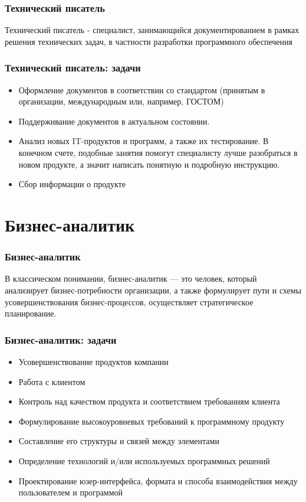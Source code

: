 \documentclass{../industrial-development}
\begin{document}
	\begin{frame} \frametitle{Технический писатель}
		\begin{block}{}
			\alert {Технический писатель} - специалист, занимающийся документированием в рамках решения технических задач, в частности разработки программного обеспечения
		\end{block}
	\end{frame}

	\begin{frame} \frametitle{Технический писатель: задачи}
			\begin{itemize}
				\item Оформление документов в соответствии со стандартом (принятым в организации, международным или, например, ГОСТОМ)
				\item Поддерживание документов в актуальном состоянии.
				\item Анализ новых IT-продуктов и программ, а также их тестирование. В конечном счете, подобные занятия помогут специалисту лучше разобраться в новом продукте, а значит написать понятную и подробную инструкцию.
				\item  Сбор информации о продукте
			\end{itemize}
	\end{frame}
	
	\section{Бизнес-аналитик}
	
	\begin{frame} \frametitle{Бизнес-аналитик}
		\begin{block}{}
			\alert {}В классическом понимании, {бизнес-аналитик} — это человек, который анализирует бизнес-потребности организации, а также формулирует пути и схемы усовершенствования бизнес-процессов, осуществляет стратегическое планирование. 
		\end{block}
		
	\end{frame}
	
	\begin{frame} \frametitle{Бизнес-аналитик: задачи}
		\begin{itemize}
			\item Усовершенствование продуктов компании
			\item Работа с клиентом
			\item Контроль над качеством продукта и соответствием требованиям клиента
			\item Формулирование высокоуровневых требований к программному продукту
			\item Составление его структуры и связей между элементами
			\item Определение технологий и/или используемых программных решений
			\item Проектирование юзер-интерфейса, формата и способа взаимодействия между пользователем и программой
		\end{itemize}
	\end{frame}
	
\end{document}
